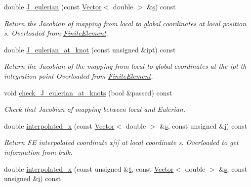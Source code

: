 \begin{DoxyCompactItemize}
double \hyperlink{classoomph_1_1FaceElement_a919d0d76746eaa78a8a3c7f75f99a9e5}{J\+\_\+eulerian} (const \hyperlink{classoomph_1_1Vector}{Vector}$<$ double $>$ \&\hyperlink{cfortran_8h_ab7123126e4885ef647dd9c6e3807a21c}{s}) const
\begin{DoxyCompactList}\small\item\em Return the Jacobian of mapping from local to global coordinates at local position s. Overloaded from \hyperlink{classoomph_1_1FiniteElement}{Finite\+Element}. \end{DoxyCompactList}\item 
double \hyperlink{classoomph_1_1FaceElement_aa6380a08afc18bd4f35e337a1131a9d8}{J\+\_\+eulerian\+\_\+at\+\_\+knot} (const unsigned \&ipt) const
\begin{DoxyCompactList}\small\item\em Return the Jacobian of the mapping from local to global coordinates at the ipt-\/th integration point Overloaded from \hyperlink{classoomph_1_1FiniteElement}{Finite\+Element}. \end{DoxyCompactList}\item 
void \hyperlink{classoomph_1_1FaceElement_aabfb54314baeb47bb56f8de8e4dfe513}{check\+\_\+\+J\+\_\+eulerian\+\_\+at\+\_\+knots} (bool \&passed) const
\begin{DoxyCompactList}\small\item\em Check that Jacobian of mapping between local and Eulerian. \end{DoxyCompactList}\item 
double \hyperlink{classoomph_1_1FaceElement_a7aa612fec3604e08344503fbcdc357c8}{interpolated\+\_\+x} (const \hyperlink{classoomph_1_1Vector}{Vector}$<$ double $>$ \&\hyperlink{cfortran_8h_ab7123126e4885ef647dd9c6e3807a21c}{s}, const unsigned \&\hyperlink{cfortran_8h_adb50e893b86b3e55e751a42eab3cba82}{i}) const
\begin{DoxyCompactList}\small\item\em Return FE interpolated coordinate x\mbox{[}i\mbox{]} at local coordinate s. Overloaded to get information from bulk. \end{DoxyCompactList}\item 
double \hyperlink{classoomph_1_1FaceElement_ac923e43c8868ffe4c6e2284bb63013f0}{interpolated\+\_\+x} (const unsigned \&\hyperlink{cfortran_8h_af6f0bd3dc13317f895c91323c25c2b8f}{t}, const \hyperlink{classoomph_1_1Vector}{Vector}$<$ double $>$ \&\hyperlink{cfortran_8h_ab7123126e4885ef647dd9c6e3807a21c}{s}, const unsigned \&\hyperlink{cfortran_8h_adb50e893b86b3e55e751a42eab3cba82}{i}) const

\end{DoxyCompactItemize}
